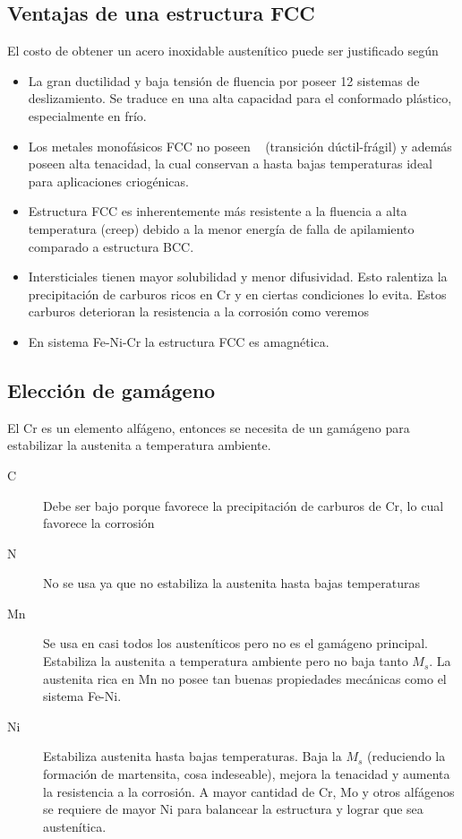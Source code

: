 \subsection{Ventajas de una estructura FCC}
El costo de obtener un acero inoxidable austenítico puede ser justificado según
\begin{itemize}
	\item La gran ductilidad y baja tensión de fluencia por poseer 12 sistemas de deslizamiento. Se traduce en una alta capacidad para el conformado plástico, especialmente en frío.
	\item Los metales monofásicos FCC no poseen \Tdf~ (transición dúctil-frágil) y además poseen alta tenacidad, la cual conservan a hasta bajas temperaturas ideal para aplicaciones criogénicas.
	\item Estructura FCC es inherentemente más resistente a la fluencia a alta temperatura (creep) debido a la menor energía de falla de apilamiento comparado a estructura BCC.
	\item Intersticiales tienen mayor solubilidad y menor difusividad. Esto ralentiza la precipitación de carburos ricos en Cr y en ciertas condiciones lo evita. Estos carburos deterioran la resistencia a la corrosión como veremos
	\item En sistema Fe-Ni-Cr la estructura FCC es amagnética.
\end{itemize}



\subsection*{Elección de gamágeno}
El Cr es un elemento alfágeno, entonces se necesita de un gamágeno para estabilizar la austenita a temperatura ambiente.
\begin{description}
	\item[C] Debe ser bajo porque favorece la precipitación de carburos de Cr, lo cual favorece la corrosión
	\item[N] No se usa ya que no estabiliza la austenita hasta bajas temperaturas
	\item[Mn] Se usa en casi todos los austeníticos pero no es el gamágeno principal. Estabiliza la austenita a temperatura ambiente pero no baja tanto $M_s$. La austenita rica en Mn no posee tan buenas propiedades mecánicas como el sistema Fe-Ni.
	\item[Ni] Estabiliza austenita hasta bajas temperaturas. Baja la $M_s$ (reduciendo la formación de martensita, cosa indeseable), mejora la tenacidad y aumenta la resistencia a la corrosión. A mayor cantidad de Cr, Mo y otros alfágenos se requiere de mayor Ni para balancear la estructura y lograr que sea austenítica.
\end{description}



